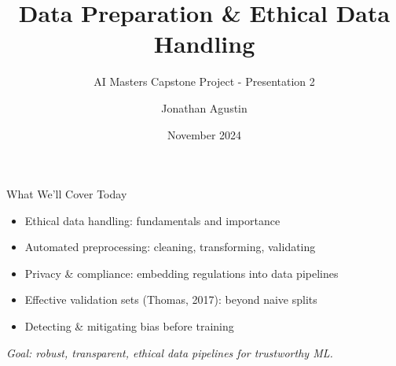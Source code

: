 \documentclass[aspectratio=169]{beamer}
\title{Data Preparation \& Ethical Data Handling}
\subtitle{AI Masters Capstone Project - Presentation 2}
\author{Jonathan Agustin}
\date{November 2024}
\begin{document}

\maketitle


\begin{frame}{What We'll Cover Today}
\begin{itemize}
\item Ethical data handling: fundamentals and importance
\item Automated preprocessing: cleaning, transforming, validating
\item Privacy \& compliance: embedding regulations into data pipelines
\item Effective validation sets (Thomas, 2017): beyond naive splits
\item Detecting \& mitigating bias before training
\end{itemize}

\emph{Goal: robust, transparent, ethical data pipelines for trustworthy ML.}
\end{frame}

\end{document}
